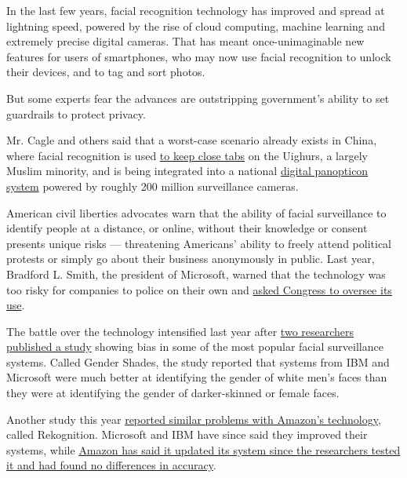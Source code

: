In the last few years, facial recognition technology has improved and
spread at lightning speed, powered by the rise of cloud computing,
machine learning and extremely precise digital cameras. That has meant
once-unimaginable new features for users of smartphones, who may now use
facial recognition to unlock their devices, and to tag and sort photos.

But some experts fear the advances are outstripping government's ability
to set guardrails to protect privacy.

Mr. Cagle and others said that a worst-case scenario already exists in
China, where facial recognition is used
\href{https://www.nytimes3xbfgragh.onion/2019/04/14/technology/china-surveillance-artificial-intelligence-racial-profiling.html}{to
keep close tabs} on the Uighurs, a largely Muslim minority, and is being
integrated into a national
\href{https://www.nytimes3xbfgragh.onion/2018/07/08/business/china-surveillance-technology.html}{digital
panopticon system} powered by roughly 200 million surveillance cameras.

American civil liberties advocates warn that the ability of facial
surveillance to identify people at a distance, or online, without their
knowledge or consent presents unique risks --- threatening Americans'
ability to freely attend political protests or simply go about their
business anonymously in public. Last year, Bradford L. Smith, the
president of Microsoft, warned that the technology was too risky for
companies to police on their own and
\href{https://www.nytimes3xbfgragh.onion/2018/07/13/technology/microsoft-facial-recognition.html}{asked
Congress to oversee its use}.

The battle over the technology intensified last year after
\href{https://www.nytimes3xbfgragh.onion/2018/02/09/technology/facial-recognition-race-artificial-intelligence.html}{two
researchers published a study} showing bias in some of the most popular
facial surveillance systems. Called Gender Shades, the study reported
that systems from IBM and Microsoft were much better at identifying the
gender of white men's faces than they were at identifying the gender of
darker-skinned or female faces.

Another study this year
\href{https://www.nytimes3xbfgragh.onion/2019/01/24/technology/amazon-facial-technology-study.html}{reported
similar problems with Amazon's technology}, called Rekognition.
Microsoft and IBM have since said they improved their systems, while
\href{https://www.nytimes3xbfgragh.onion/2019/04/03/technology/amazon-facial-recognition-technology.html}{Amazon
has said it updated its system since the researchers tested it and had
found no differences in accuracy}.

